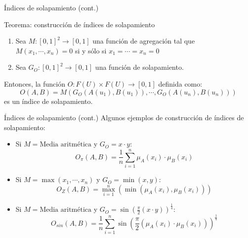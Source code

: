 \documentclass{beamer}
\begin{document}
\begin{frame}{Índices de solapamiento (cont.)}
	\begin{block}{Teorema: construcción de índices de solapamiento}
		\begin{enumerate}
			\item Sea $M : [0,1]^{2} \rightarrow [0,1]$ una función de agregación tal que $M(x_{1},\cdots,x_{n}) = 0$ si y sólo si $x_{1} = \cdots = x_{n} = 0$
			\item Sea $G_{O} : [0,1]^{2} \rightarrow [0,1]$ una función de solapamiento.
		\end{enumerate}
		Entonces, la función $O: F(U) \times F(U) \rightarrow [0,1]$ definida como:
		\begin{equation}
		O(A,B) = M(G_{O}(A(u_{1}),B(u_{1})),\cdots,G_{O}(A(u_{n}),B(u_{n})))
		\end{equation}
		es un índice de solapamiento.
	\end{block}
\end{frame}

\begin{frame}{Índices de solapamiento (cont.)}
Algunos ejemplos de construcción de índices de solapamiento:
\begin{itemize}
	\item Si $M = \text{Media aritmética}$ y $G_O = x \cdot y$:
	\begin{equation}
	O_{\pi}(A,B) = \frac{1}{n}\sum_{i=1}^{n}\mu_A(x_i) \cdot \mu_B(x_i)
	\end{equation}
	\item Si $M = \max(x_1,\cdots,x_n)$ y $G_O = \min(x,y)$:
	\begin{equation}
	O_{Z}(A,B) = \max\limits_{i=1}^{n}(\min(\mu_A(x_i),\mu_B(x_i)))
	\end{equation}
	\item Si $M = \text{Media aritmética}$ y $G_O = \sin(\frac{\pi}{2}(x \cdot y))^{\frac{1}{4}}$:
	\begin{equation}
	O_{sin}(A, B) = \frac{1}{n}\sum_{i=1}^{n}\sin(\frac{\pi}{2}(\mu_A(x_i) \cdot \mu_B(x_i)))^{\frac{1}{4}}
	\end{equation}
\end{itemize}
\end{frame}
\end{document}
